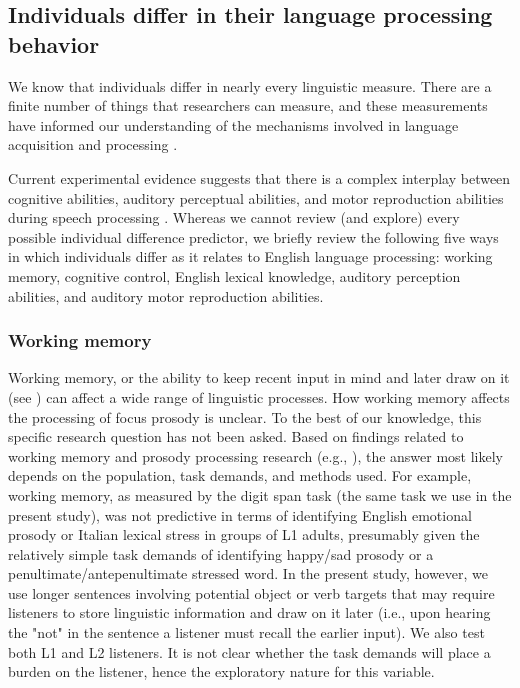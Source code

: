 \subsection{Individuals differ in their language processing behavior}
We know that individuals differ in nearly every linguistic measure. There are a finite number of things that researchers can measure, and these measurements have informed our understanding of the mechanisms involved in language acquisition and processing \cite{Kidd2018, skehan1991individual, nelson1981individual}. 

Current experimental evidence suggests that there is a complex interplay between cognitive abilities, auditory perceptual abilities, and motor reproduction abilities during speech processing \citep{saito2022does, bramlett_wiener_24_speechprosody, bakkouche2025effects, Kachlicka_Saito_Tierney_2019}. Whereas we cannot review (and explore) every possible individual difference predictor, we briefly review the following five ways in which individuals differ as it relates to English language processing: working memory, cognitive control, English lexical knowledge, auditory perception abilities, and auditory motor reproduction abilities.


\subsubsection{Working memory}
Working memory, or the ability to keep recent input in mind and later draw on it (see \cite{baddeley2003working,carpenter2013role}) can affect a wide range of linguistic processes. How working memory affects the processing of focus prosody is unclear. To the best of our knowledge, this specific research question has not been asked. Based on findings related to working memory and prosody processing research (e.g., \cite{traxler2009hierarchical,ferreira2015prosody, bishop2021exploring}), the answer most likely depends on the population, task demands, and methods used. For example, working memory, as measured by the digit span task (the same task we use in the present study), was not predictive in terms of identifying English emotional prosody \citep{sinagra2022perception} or Italian lexical stress \citep{ppcc} in groups of L1 adults, presumably given the relatively simple task demands of identifying happy/sad prosody or a penultimate/antepenultimate stressed word. In the present study, however, we use longer sentences involving potential object or verb targets that may require listeners to store linguistic information and draw on it later (i.e., upon hearing the "not" in the sentence a listener must recall the earlier input). We also test both L1 and L2 listeners. It is not clear whether the task demands will place a burden on the listener, hence the exploratory nature for this variable. 


